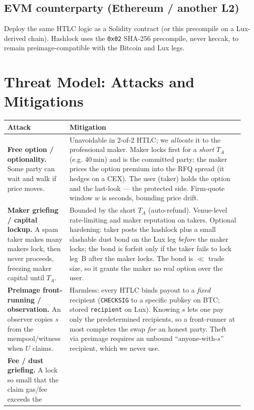 \documentclass[11pt]{article}
\begin{document}
\subsection{EVM counterparty (Ethereum / another L2)}
Deploy the same HTLC logic as a Solidity contract (or this precompile on a
Lux-derived chain). Hashlock uses the \texttt{0x02} SHA-256 precompile, never
keccak, to remain preimage-compatible with the Bitcoin and Lux legs.

\section{Threat Model: Attacks and Mitigations}

\begin{center}\small
\begin{tabular}{@{}p{0.235\linewidth}p{0.715\linewidth}@{}}
\toprule
Attack & Mitigation \\
\midrule
\textbf{Free option / optionality.} Some party can wait and walk if price moves.
& Unavoidable in 2-of-2 HTLC; we \emph{allocate} it to the professional maker.
Maker locks first for a \emph{short} $T_A$ (e.g. 40\,min) and is the committed
party; the maker prices the option premium into the RFQ spread (it hedges on a
CEX). The user (taker) holds the option and the last-look --- the protected
side. Firm-quote window $w$ is seconds, bounding price drift. \\[2pt]
\textbf{Maker griefing / capital lockup.} A spam taker makes many makers lock,
then never proceeds, freezing maker capital until $T_A$.
& Bounded by the short $T_A$ (auto-refund). Venue-level rate-limiting and maker
reputation on takers. Optional hardening: taker posts the hashlock plus a small
slashable dust bond on the Lux leg \emph{before} the maker locks; the bond is
forfeit only if the taker fails to lock leg~B after the maker locks. The bond is
$\ll$ trade size, so it grants the maker no real option over the user. \\[2pt]
\textbf{Preimage front-running / observation.} An observer copies $s$ from the
mempool/witness when $U$ claims.
& Harmless: every HTLC binds payout to a \emph{fixed} recipient
(\texttt{CHECKSIG} to a specific pubkey on BTC; stored \texttt{recipient} on
Lux). Knowing $s$ lets one pay only the predetermined recipients, so a
front-runner at most completes the swap \emph{for} an honest party. Theft via
preimage requires an unbound ``anyone-with-$s$'' recipient, which we never use. \\[2pt]
\textbf{Fee / dust griefing.} A lock so small that the claim gas/fee exceeds the

\end{tabular}
\end{center}
\end{document}
